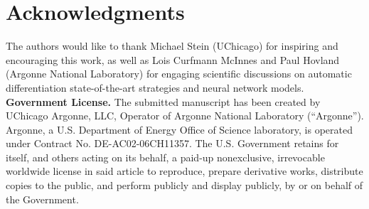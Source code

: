 \documentclass{article}
\begin{document}
\section*{Acknowledgments} The authors would like to thank Michael Stein (UChicago) for  inspiring and encouraging this work, as well as Lois Curfmann McInnes and Paul Hovland (Argonne National Laboratory) for engaging scientific discussions on automatic differentiation state-of-the-art strategies and neural network models. 
{\bf Government License.} The submitted manuscript has been created by
UChicago Argonne, LLC, Operator of Argonne National Laboratory
(``Argonne''). Argonne, a U.S. Department of Energy Office of Science
laboratory, is operated under Contract No. DE-AC02-06CH11357. The
U.S. Government retains for itself, and others acting on its behalf, a
paid-up nonexclusive, irrevocable worldwide license in said article to
reproduce, prepare derivative works, distribute copies to the public,
and perform publicly and display publicly, by or on behalf of the
Government.  


%

\end{document}
